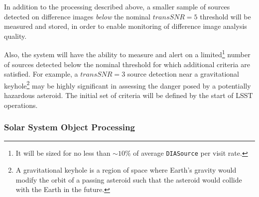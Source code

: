 \documentclass[12pt]{article}
\newcommand{\code}[1]{\texttt{#1}}
\newcommand{\DIASource}{\code{DIASource}\xspace}
\newcommand{\transSNR}{5\xspace}
\begin{document}
In addition to the processing described above, a smaller sample of sources detected on difference images {\em below} the nominal $transSNR = \transSNR$ threshold will be measured and stored, in order to enable monitoring of difference image analysis quality.

Also, the system will have the ability to measure and alert on a limited\footnote{It will be sized for no less than $\sim 10\%$ of average \DIASource per visit rate.} number of sources detected below the nominal threshold for which additional criteria are satisfied. For example, a $transSNR = 3$ source detection near a gravitational keyhole\footnote{
A gravitational keyhole is a region of space where Earth's gravity would modify the orbit of a passing asteroid
such that the asteroid would collide with the Earth in the future.}
may be highly significant in assessing the danger posed by a potentially hazardous asteroid.
The initial set of criteria will be defined by the start of LSST operations.

\subsubsection{Solar System Object Processing}
\label{sec:ssProcessing}
\end{document}
